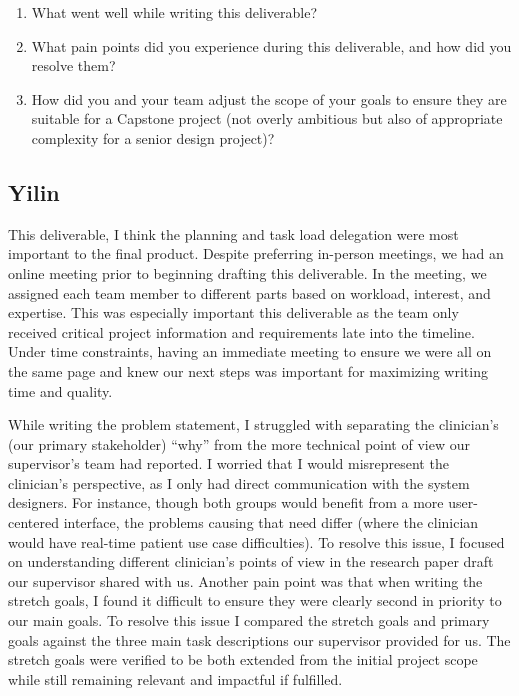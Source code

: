 \documentclass{article}
\begin{document}


\begin{enumerate}
    \item What went well while writing this deliverable? 
    \item What pain points did you experience during this deliverable, and how
    did you resolve them?
    \item How did you and your team adjust the scope of your goals to ensure
    they are suitable for a Capstone project (not overly ambitious but also of
    appropriate complexity for a senior design project)?
\end{enumerate}  

\subsection*{Yilin}
This deliverable, I think the planning and task load delegation were most important to the final product. 
Despite preferring in-person meetings, we had an online meeting prior to beginning drafting this deliverable. 
In the meeting, we assigned each team member to different parts based on workload, interest, and expertise. 
This was especially important this deliverable as the team only received critical project information and requirements 
late into the timeline. Under time constraints, having an immediate meeting to ensure we were all on the same page and 
knew our next steps was important for maximizing writing time and quality. 

While writing the problem statement, I struggled with separating the clinician’s (our primary stakeholder) 
“why” from the more technical point of view our supervisor's team had reported. I worried that I would misrepresent the
clinician's perspective, as I only had direct communication with the system designers. For instance, though both groups 
would benefit from a more user-centered interface, the problems causing that need differ 
(where the clinician would have real-time patient use case difficulties). 
To resolve this issue, I focused on understanding different clinician’s points of view 
in the research paper draft our supervisor shared with us. Another pain point was that when 
writing the stretch goals, I found it difficult to ensure they were clearly second in priority 
to our main goals. To resolve this issue I compared the stretch goals and primary goals against 
the three main task descriptions our supervisor provided for us. The stretch goals were verified to be both extended 
from the initial project scope while still remaining relevant and impactful if fulfilled.
\end{document}
